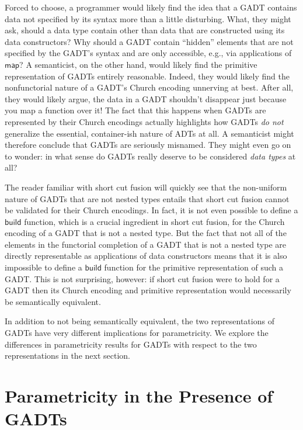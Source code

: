 \documentclass[acmsmall,screen,review,anonymous]{acmart}
\theoremstyle{definition}
\begin{document}
Forced to choose, a programmer would likely find the idea that a GADT
contains data not specified by its syntax more than a little
disturbing. What, they might ask, should a data type contain other
than data that are constructed using its data constructors? Why should
a GADT contain ``hidden'' elements that are not specified by the
GADT's syntax and are only accessible, e.g., via applications of
$\mathsf{map}$? A semanticist, on the other hand, would likely find
the primitive representation of GADTs entirely reasonable. Indeed,
they would likely find the nonfunctorial nature of a GADT's Church
encoding unnerving at best. After all, they would likely argue, the
data in a GADT shouldn't disappear just because you map a function
over it! The fact that this happens when GADTs are represented by
their Church encodings actually highlights how GADTs {\em do not}
generalize the essential, container-ish nature of ADTs at all. A
semanticist might therefore conclude that GADTs are seriously
misnamed. They might even go on to wonder: in what sense do GADTs
really deserve to be considered {\em data types} at all?

The reader familiar with short cut fusion will quickly see that the
non-uniform nature of GADTs that are not nested types entails that
short cut fusion cannot be validated for their Church encodings. In
fact, it is not even possible to define a $\mathsf{build}$ function,
which is a crucial ingredient in short cut fusion, for the Church
encoding of a GADT that is not a nested type. But the fact that not
all of the elements in the functorial completion of a GADT that is not
a nested type are directly representable as applications of data
constructors means that it is also impossible to define a
$\mathsf{build}$ function for the primitive representation of such a
GADT.  This is not surprising, however: if short cut fusion were to
hold for a GADT then its Church encoding and primitive representation
would necessarily be semantically equivalent.

In addition to not being semantically equivalent, the two
representations of GADTs have very different implications for
parametricity. We explore the differences in parametricity results for
GADTs with respect to the two representations in the next section.

\section{Parametricity in the Presence of GADTs}\label{sec:par}
\end{document}
